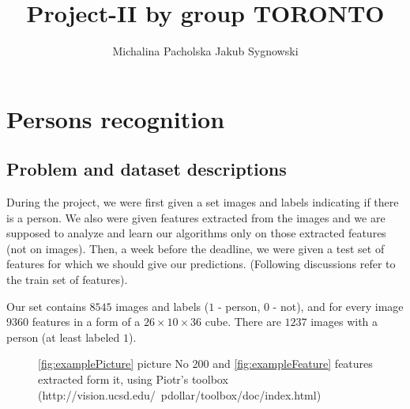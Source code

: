 \documentclass[]{article}
\title{Project-II by group TORONTO}
\author{Michalina Pacholska \And Jakub Sygnowski}
\begin{document}
\section{Persons recognition}
\subsection{Problem and dataset descriptions}
  During the project, we were first given a set images and labels indicating if there is a person. We also were given features extracted from the images and we are supposed to analyze and learn our algorithms only on those extracted features (not on images). Then, a week before the deadline, we were given a test set of features for which we should give our predictions. (Following discussions refer to the train set of features). 

  Our set contains $8545$ images and labels ($1$ - person, $0$ - not), and for every image $9360$ features in a form of a $26\times10\times36$ cube. There are $1237$ images with a person (at least labeled $1$). 

\begin{figure}[!h]
  \center
  \;
  \caption{ \ref{fig:examplePicture} picture No 200 and \ref{fig:exampleFeature} features extracted form it, using Piotr's toolbox (http://vision.ucsd.edu/~pdollar/toolbox/doc/index.html) %
  }
\end{figure}
\end{document}

